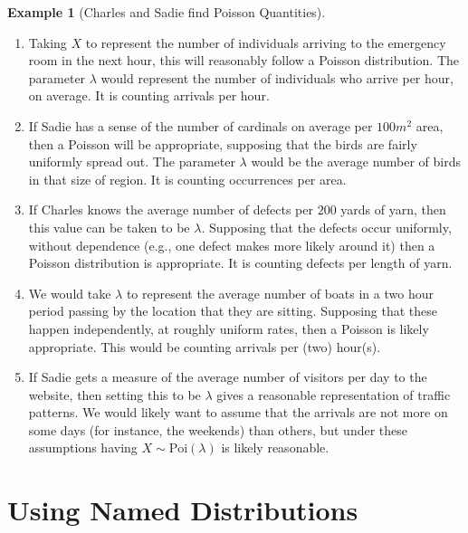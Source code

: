 \documentclass[
  letterpaper,
  DIV=11,
  numbers=noendperiod]{scrreprt}
\providecommand{\tightlist}{%
  \setlength{\itemsep}{0pt}\setlength{\parskip}{0pt}}\usepackage{longtable,booktabs,array}
\theoremstyle{definition}
\theoremstyle{definition}
\newtheorem{example}{Example}[chapter]
\theoremstyle{definition}
\theoremstyle{remark}
\begin{document}
\begin{example}[Charles and Sadie find Poisson
Quantities]
\begin{tcolorbox}[enhanced jigsaw, colback=white, colframe=quarto-callout-color-frame, arc=.35mm, leftrule=.75mm, rightrule=.15mm, opacityback=0, breakable, bottomrule=.15mm, left=2mm, toprule=.15mm]
\begin{enumerate}
\def\labelenumi{\alph{enumi}.}
\tightlist
\item
  Taking \(X\) to represent the number of individuals arriving to the
  emergency room in the next hour, this will reasonably follow a Poisson
  distribution. The parameter \(\lambda\) would represent the number of
  individuals who arrive per hour, on average. It is counting arrivals
  per hour.
\item
  If Sadie has a sense of the number of cardinals on average per
  \(100m^2\) area, then a Poisson will be appropriate, supposing that
  the birds are fairly uniformly spread out. The parameter \(\lambda\)
  would be the average number of birds in that size of region. It is
  counting occurrences per area.
\item
  If Charles knows the average number of defects per \(200\) yards of
  yarn, then this value can be taken to be \(\lambda\). Supposing that
  the defects occur uniformly, without dependence (e.g., one defect
  makes more likely around it) then a Poisson distribution is
  appropriate. It is counting defects per length of yarn.
\item
  We would take \(\lambda\) to represent the average number of boats in
  a two hour period passing by the location that they are sitting.
  Supposing that these happen independently, at roughly uniform rates,
  then a Poisson is likely appropriate. This would be counting arrivals
  per (two) hour(s).
\item
  If Sadie gets a measure of the average number of visitors per day to
  the website, then setting this to be \(\lambda\) gives a reasonable
  representation of traffic patterns. We would likely want to assume
  that the arrivals are not more on some days (for instance, the
  weekends) than others, but under these assumptions having
  \(X \sim \text{Poi}(\lambda)\) is likely reasonable.
\end{enumerate}

\end{tcolorbox}

\end{example}

\section{Using Named Distributions}\label{using-named-distributions}
\end{document}

